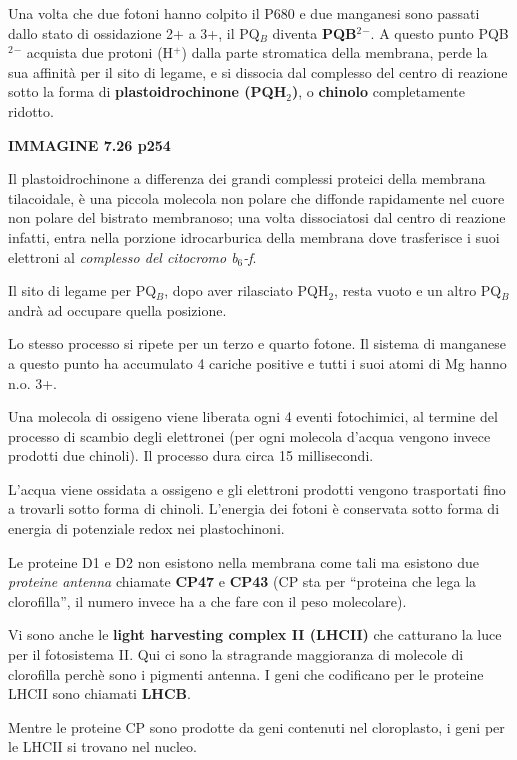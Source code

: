 \documentclass[]{article}
\begin{document}
Una volta che due fotoni hanno colpito il P680 e due manganesi sono
passati dallo stato di ossidazione 2+ a 3+, il PQ$_B$ diventa
\textbf{PQB$^2$$^-$}. A questo punto PQB$^2$$^-$ acquista due protoni
(H$^+$) dalla parte stromatica della membrana, perde la sua affinità per
il sito di legame, e si dissocia dal complesso del centro di reazione
sotto la forma di \textbf{plastoidrochinone (PQH$_2$)}, o
\textbf{chinolo} completamente ridotto.

\textbf{IMMAGINE 7.26 p254}

Il plastoidrochinone a differenza dei grandi complessi proteici della
membrana tilacoidale, è una piccola molecola non polare che diffonde
rapidamente nel cuore non polare del bistrato membranoso; una volta
dissociatosi dal centro di reazione infatti, entra nella porzione
idrocarburica della membrana dove trasferisce i suoi elettroni al
\emph{complesso del citocromo b$_6$-f}.

Il sito di legame per PQ$_B$, dopo aver rilasciato PQH$_2$, resta vuoto
e un altro PQ$_B$ andrà ad occupare quella posizione.

Lo stesso processo si ripete per un terzo e quarto fotone. Il sistema di
manganese a questo punto ha accumulato 4 cariche positive e tutti i suoi
atomi di Mg hanno n.o. 3+.

Una molecola di ossigeno viene liberata ogni 4 eventi fotochimici, al
termine del processo di scambio degli elettronei (per ogni molecola
d'acqua vengono invece prodotti due chinoli). Il processo dura circa 15
millisecondi.

L'acqua viene ossidata a ossigeno e gli elettroni prodotti vengono
trasportati fino a trovarli sotto forma di chinoli. L'energia dei fotoni
è conservata sotto forma di energia di potenziale redox nei
plastochinoni.

Le proteine D1 e D2 non esistono nella membrana come tali ma esistono
due \emph{proteine antenna} chiamate \textbf{CP47} e \textbf{CP43} (CP
sta per ``proteina che lega la clorofilla'', il numero invece ha a che
fare con il peso molecolare).

Vi sono anche le \textbf{light harvesting complex II (LHCII)} che
catturano la luce per il fotosistema II. Qui ci sono la stragrande
maggioranza di molecole di clorofilla perchè sono i pigmenti antenna. I
geni che codificano per le proteine LHCII sono chiamati \textbf{LHCB}.

Mentre le proteine CP sono prodotte da geni contenuti nel cloroplasto, i
geni per le LHCII si trovano nel nucleo.
\end{document}
